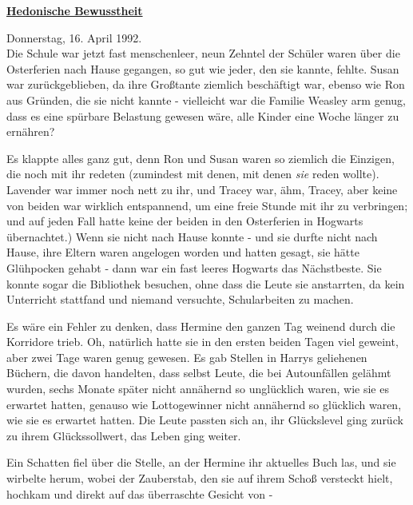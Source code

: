 

\hypertarget{hedonische-bewusstheit}{%

\textbf{\uline{Hedonische Bewusstheit}}

Donnerstag, 16. April 1992.\\ Die Schule war jetzt fast menschenleer, neun Zehntel der Schüler waren über die Osterferien nach Hause gegangen, so gut wie jeder, den sie kannte, fehlte. Susan war zurückgeblieben, da ihre Großtante ziemlich beschäftigt war, ebenso wie Ron aus Gründen, die sie nicht kannte - vielleicht war die Familie Weasley arm genug, dass es eine spürbare Belastung gewesen wäre, alle Kinder eine Woche länger zu ernähren?

Es klappte alles ganz gut, denn Ron und Susan waren so ziemlich die Einzigen, die noch mit ihr redeten (zumindest mit denen, mit denen \emph{sie} reden wollte). Lavender war immer noch nett zu ihr, und Tracey war, ähm, Tracey, aber keine von beiden war wirklich entspannend, um eine freie Stunde mit ihr zu verbringen; und auf jeden Fall hatte keine der beiden in den Osterferien in Hogwarts übernachtet.) Wenn sie nicht nach Hause konnte - und sie durfte nicht nach Hause, ihre Eltern waren angelogen worden und hatten gesagt, sie hätte Glühpocken gehabt - dann war ein fast leeres Hogwarts das Nächstbeste. Sie konnte sogar die Bibliothek besuchen, ohne dass die Leute sie anstarrten, da kein Unterricht stattfand und niemand versuchte, Schularbeiten zu machen.

Es wäre ein Fehler zu denken, dass Hermine den ganzen Tag weinend durch die Korridore trieb. Oh, natürlich hatte sie in den ersten beiden Tagen viel geweint, aber zwei Tage waren genug gewesen. Es gab Stellen in Harrys geliehenen Büchern, die davon handelten, dass selbst Leute, die bei Autounfällen gelähmt wurden, sechs Monate später nicht annähernd so unglücklich waren, wie sie es erwartet hatten, genauso wie Lottogewinner nicht annähernd so glücklich waren, wie sie es erwartet hatten. Die Leute passten sich an, ihr Glückslevel ging zurück zu ihrem Glückssollwert, das Leben ging weiter.

Ein Schatten fiel über die Stelle, an der Hermine ihr aktuelles Buch las, und sie wirbelte herum, wobei der Zauberstab, den sie auf ihrem Schoß versteckt hielt, hochkam und direkt auf das überraschte Gesicht von -

}
